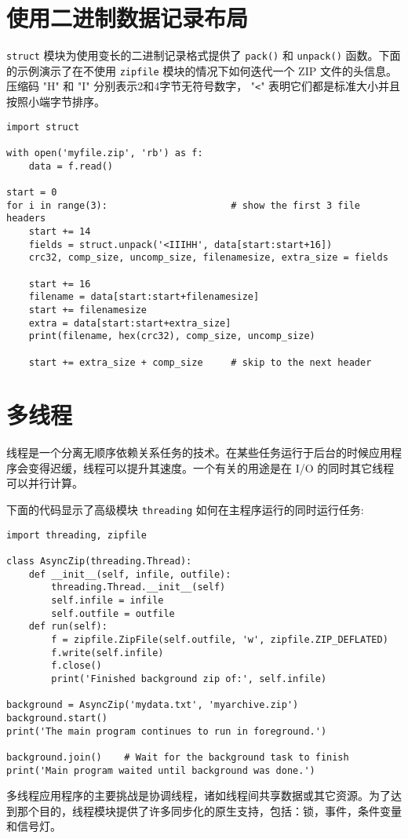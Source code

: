 \section{使用二进制数据记录布局}
\texttt{struct} 模块为使用变长的二进制记录格式提供了 \texttt{pack()} 和 \texttt{unpack()} 函数。下面的示例演示了在不使用 \texttt{zipfile} 模块的情况下如何迭代一个 ZIP 文件的头信息。压缩码 "H" 和 "I" 分别表示2和4字节无符号数字， "\verb|<|" 表明它们都是标准大小并且按照小端字节排序。
\begin{lstlisting}
import struct

with open('myfile.zip', 'rb') as f:
    data = f.read()

start = 0
for i in range(3):                      # show the first 3 file headers
    start += 14
    fields = struct.unpack('<IIIHH', data[start:start+16])
    crc32, comp_size, uncomp_size, filenamesize, extra_size = fields

    start += 16
    filename = data[start:start+filenamesize]
    start += filenamesize
    extra = data[start:start+extra_size]
    print(filename, hex(crc32), comp_size, uncomp_size)

    start += extra_size + comp_size     # skip to the next header
\end{lstlisting}
\section{多线程}
线程是一个分离无顺序依赖关系任务的技术。在某些任务运行于后台的时候应用程序会变得迟缓，线程可以提升其速度。一个有关的用途是在 I/O 的同时其它线程可以并行计算。

下面的代码显示了高级模块 \texttt{threading} 如何在主程序运行的同时运行任务:
\begin{lstlisting}
import threading, zipfile

class AsyncZip(threading.Thread):
    def __init__(self, infile, outfile):
        threading.Thread.__init__(self)
        self.infile = infile
        self.outfile = outfile
    def run(self):
        f = zipfile.ZipFile(self.outfile, 'w', zipfile.ZIP_DEFLATED)
        f.write(self.infile)
        f.close()
        print('Finished background zip of:', self.infile)

background = AsyncZip('mydata.txt', 'myarchive.zip')
background.start()
print('The main program continues to run in foreground.')

background.join()    # Wait for the background task to finish
print('Main program waited until background was done.')
\end{lstlisting}
多线程应用程序的主要挑战是协调线程，诸如线程间共享数据或其它资源。为了达到那个目的，线程模块提供了许多同步化的原生支持，包括：锁，事件，条件变量和信号灯。

